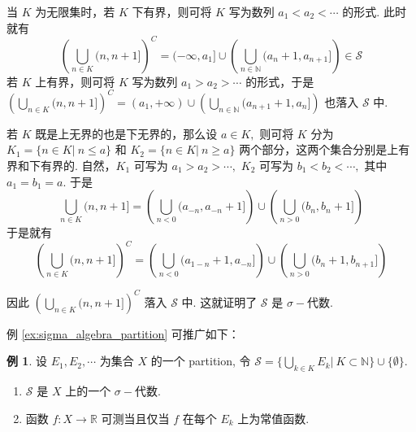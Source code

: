 \documentclass[12pt, a4paper, oneside]{book}
\numberwithin{figure}{section}
\theoremstyle{definition}
\newtheorem{example}[theorem]{例}
\begin{document}
当 $K$ 为无限集时，若 $K$ 下有界，则可将 $K$ 写为数列 $a_1<a_2<\cdots$ 的形式. 此时就有 
\begin{equation}
    \left(\bigcup_{n\in K}(n,n+1]\right)^C = (-\infty,a_1]\cup \left(\bigcup_{n\in\mathbb N} (a_n+1,a_{n+1}]\right)\in\mathcal S
\end{equation}
若 $K$ 上有界，则可将 $K$ 写为数列 $a_1>a_2>\cdots$ 的形式，于是 $\left(\bigcup_{n\in K}(n,n+1]\right)^C = (a_1,+\infty)\cup\left(\bigcup_{n\in\mathbb N} (a_{n+1}+1,a_{n}]\right)$ 也落入 $\mathcal S$ 中. 

若 $K$ 既是上无界的也是下无界的，那么设 $a\in K,$ 则可将 $K$ 分为 $K_1=\{n\in K|\ n\leq a\}$ 和 $K_2=\{n\in K|\ n\geq a\}$ 两个部分，这两个集合分别是上有界和下有界的. 自然，$K_1$ 可写为 $a_1>a_2>\cdots,$ $K_2$ 可写为 $b_1<b_2<\cdots,$ 其中 $a_1=b_1=a.$ 于是 
\begin{equation}
    \bigcup_{n\in K}(n,n+1] = \left(\bigcup_{n<0} (a_{-n},a_{-n}+1]\right) \cup \left(\bigcup_{n>0} (b_n,b_{n}+1]\right)
\end{equation}
于是就有 
\begin{equation}
    \left(\bigcup_{n\in K}(n,n+1]\right)^C =\left(\bigcup_{n<0} (a_{1-n}+1,a_{-n}]\right) \cup \left(\bigcup_{n>0} (b_n+1,b_{n+1}]\right)
\end{equation}


因此 $\left(\bigcup_{n\in K}(n,n+1]\right)^C$ 落入 $\mathcal S$ 中. 这就证明了 $\mathcal S$ 是 $\sigma-$代数.

例 \ref{ex:sigma_algebra_partition} 可推广如下：
\begin{example}\label{ex:sigma_algebra_partition_general}
    设 $E_1,E_2,\cdots$ 为集合 $X$ 的一个 partition, 令 $\mathcal S=\{\bigcup_{k\in K}E_k|\ K\subset\mathbb N\}\cup\{\emptyset\}.$ 
    \begin{enumerate}[label=\alph*)]
        \item $\mathcal S$ 是 $X$ 上的一个 $\sigma-$代数.
        \item 函数 $f:X\to\mathbb R$ 可测当且仅当 $f$ 在每个 $E_k$ 上为常值函数.
    \end{enumerate}
\end{example}
\end{document}
